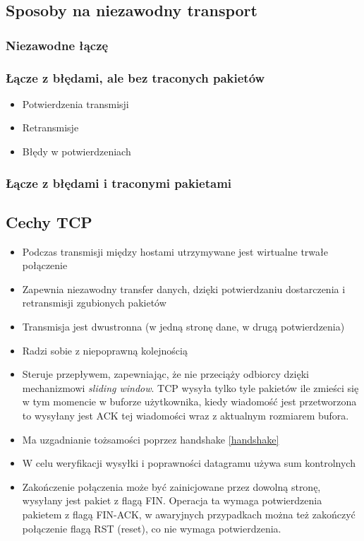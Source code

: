 \documentclass[]{article}
\begin{document}
\subsection{Sposoby na niezawodny transport}
\subsubsection{Niezawodne łączę}
\subsubsection{Łącze z błędami, ale bez traconych pakietów}
\begin{itemize}
    \item Potwierdzenia transmisji
    \item Retransmisje
    \item Błędy w potwierdzeniach
\end{itemize}
\subsubsection{Łącze z błędami i traconymi pakietami}
\subsection{Cechy TCP}
\begin{itemize}
    \item Podczas transmisji między hostami utrzymywane jest wirtualne trwałe połączenie
    \item Zapewnia niezawodny transfer danych, dzięki potwierdzaniu dostarczenia i retransmisji zgubionych pakietów
    \item Transmisja jest dwustronna (w jedną stronę dane, w drugą potwierdzenia)
    \item Radzi sobie z niepoprawną kolejnością
    \item Steruje przepływem, zapewniając, że nie przeciąży odbiorcy dzięki mechanizmowi \emph{sliding window}. TCP wysyła tylko tyle pakietów ile zmieści się w tym momencie w buforze użytkownika, kiedy wiadomość jest przetworzona to wysyłany jest ACK tej wiadomości wraz z aktualnym rozmiarem bufora.
    \item Ma uzgadnianie tożsamości poprzez handshake \ref{handshake}
    \item W celu weryfikacji wysyłki i poprawności datagramu używa sum kontrolnych
    \item Zakończenie połączenia może być zainicjowane przez dowolną stronę, wysyłany jest pakiet z flagą FIN. Operacja ta wymaga potwierdzenia pakietem z flagą FIN-ACK, w awaryjnych przypadkach można też zakończyć połączenie flagą RST (reset), co nie wymaga potwierdzenia.
\end{itemize}
\end{document}
